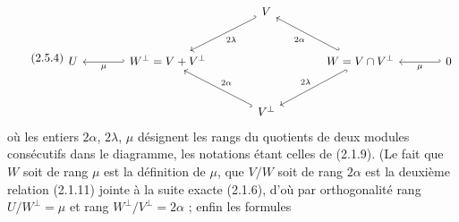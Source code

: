 \begin{equation}\tag{2.5.4}
\begin{tikzcd}[column sep=large, row sep=large]
& & V \arrow[dl, hook', "2\lambda"] & & \\
U & W^{\perp} = V + V^{\perp} \arrow[l, hook', "\mu"] & & W = V \cap V^{\perp} \arrow[ul, hook', "2\alpha"] \arrow[dl, hook, "2\lambda"'] & 0 \arrow[l, hook', "\mu"] \\
& & V^{\perp} \arrow[ul, hook, "2\alpha"'] & &
\end{tikzcd}
\end{equation}
où les entiers $2\alpha$, $2\lambda$, $\mu$ désignent les rangs du quotients de deux modules consécutifs dans le diagramme, les notations étant celles de (2.1.9). (Le fait que $W$ soit de rang $\mu$ est la définition de $\mu$, que $V/W$ soit de rang $2\alpha$ est la deuxième relation (2.1.11) jointe à la suite exacte (2.1.6), d'où par orthogonalité rang $U/W^{\perp} = \mu$ et rang $W^{\perp}/V^{\perp} = 2\alpha$ ; enfin les formules

